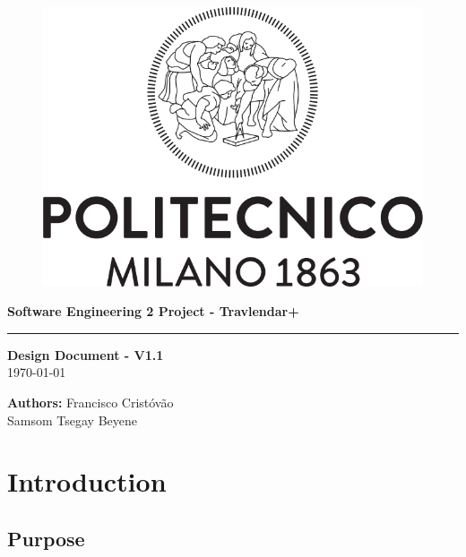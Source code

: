 \documentclass[12pt]{article}
\begin{document}
\begin{titlepage}
    \begin{center}
    \begin{figure}
        \centering
        \includegraphics[scale=0.2]{logoPolimi.png}
        \vspace{1.5cm}
    \end{figure}

    \Huge\textbf{Software Engineering 2 Project - Travlendar+}
    \rule{12cm}{0.5pt}
    \Huge\textbf{Design Document - V1.1}\\
    \today
    \end{center}
    
    \vspace{3cm}
    
    \begin{flushleft}
        \LARGE\textbf{Authors: }
        \newline\newline
        \Large\texttt{}{Francisco Cristóvão \\ Samsom Tsegay Beyene}
    \end{flushleft}



\end{titlepage}

\newpage
  \tableofcontents
\newpage

\section{Introduction}

\subsection{Purpose}
\end{document}
